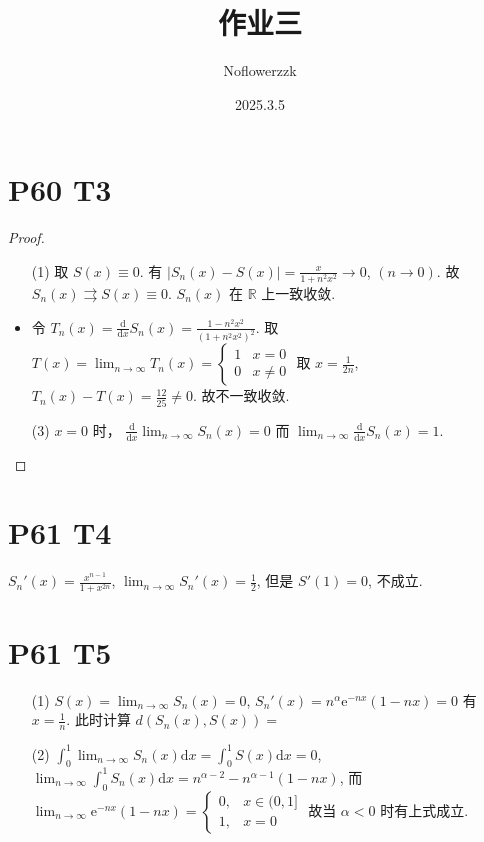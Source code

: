\documentclass{article}
\title{作业三}
\author{Noflowerzzk}
\date{2025.3.5}
\begin{document}
\maketitle

\section*{P60 T3}

\begin{proof} \quad
    \begin{itemize}
        \item [(1)] 取 $S(x) \equiv 0$. 有 $\left\lvert S_n(x) - S(x)\right\rvert = \frac{x}{1 + n^2x^2} \to 0$, $(n \to 0)$. 故 $S_n(x) \rightrightarrows S(x) \equiv 0 $. $S_n(x)$ 在 $\mathbb{R}$ 上一致收敛.
        \item 令 $T_n(x) = \frac{\mathrm{d}}{\mathrm{d}x}S_n(x) = \frac{1 - n^2x^2}{(1 + n^2x^2)^2}$. 取 $T(x) = \lim_{n \to \infty}T_n(x) = \begin{cases}
            1 & x = 0 \\
            0 & x \neq 0
        \end{cases}$
        取 $x = \frac{1}{2n}$, $T_n(x) - T(x) = \frac{12}{25} \neq 0$. 故不一致收敛.
        \item [(3)] $x = 0$ 时， $\frac{\mathrm{d}}{\mathrm{d}x}\lim_{n \to \infty}S_n(x) = 0$ 而 $\lim_{n \to \infty}\frac{\mathrm{d}}{\mathrm{d}x}S_n(x) = 1$.
    \end{itemize}
\end{proof}

\section*{P61 T4}

$S_n'(x) = \frac{x^{n - 1}}{1 + x^{2n}}$, $\lim_{n \to \infty}S_n'(x) = \frac{1}{2}$, 但是 $S'(1) = 0$, 不成立.

\section*{P61 T5}

\begin{itemize}
    \item [(1)] $S(x) = \lim_{n \to \infty} S_n(x) = 0$, $S_n'(x) = n^\alpha \mathrm{e}^{-nx}(1 - nx) = 0$ 有 $x = \frac{1}{n}$. 此时计算 $d(S_n(x), S(x)) = $
    \item [(2)] $\int_{0}^{1}\lim_{n \to \infty}S_n(x)\mathrm{d}x = \int_{0}^{1}S(x)\mathrm{d}x = 0$, $\lim_{n \to \infty}\int_{0}^{1}S_n(x)\mathrm{d}x = n^{\alpha - 2} - n^{\alpha - 1}(1 - nx)$, 而 $\lim_{n \to \infty}\mathrm{e}^{-nx}(1 - nx) = \begin{cases}
        0, & x \in (0, 1] \\
        1, & x = 0
    \end{cases}$
    故当 $\alpha < 0$ 时有上式成立.
\end{itemize}
\end{document}
